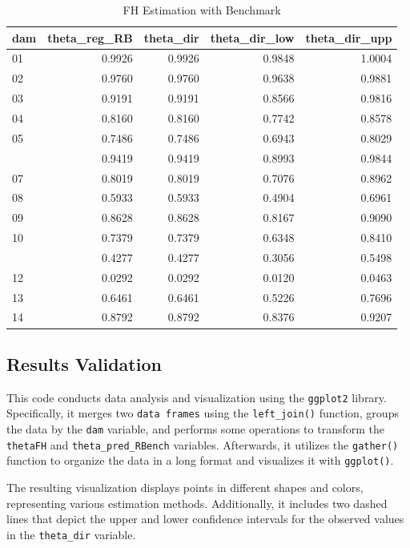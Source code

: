 \documentclass[
  12pt,
]{book}
\begin{document}
\begin{table}[H]

\caption{\label{tab:unnamed-chunk-24}FH Estimation with Benchmark}
\centering
\begin{tabular}[t]{lrrrr}
\toprule
dam & theta\_reg\_RB & theta\_dir & theta\_dir\_low & theta\_dir\_upp\\
\midrule
01 & 0.9926 & 0.9926 & 0.9848 & 1.0004\\
02 & 0.9760 & 0.9760 & 0.9638 & 0.9881\\
03 & 0.9191 & 0.9191 & 0.8566 & 0.9816\\
04 & 0.8160 & 0.8160 & 0.7742 & 0.8578\\
05 & 0.7486 & 0.7486 & 0.6943 & 0.8029\\
\addlinespace
06 & 0.9419 & 0.9419 & 0.8993 & 0.9844\\
07 & 0.8019 & 0.8019 & 0.7076 & 0.8962\\
08 & 0.5933 & 0.5933 & 0.4904 & 0.6961\\
09 & 0.8628 & 0.8628 & 0.8167 & 0.9090\\
10 & 0.7379 & 0.7379 & 0.6348 & 0.8410\\
\addlinespace
11 & 0.4277 & 0.4277 & 0.3056 & 0.5498\\
12 & 0.0292 & 0.0292 & 0.0120 & 0.0463\\
13 & 0.6461 & 0.6461 & 0.5226 & 0.7696\\
14 & 0.8792 & 0.8792 & 0.8376 & 0.9207\\
\bottomrule
\end{tabular}
\end{table}

\hypertarget{results-validation}{%
\subsection{Results Validation}\label{results-validation}}

This code conducts data analysis and visualization using the \texttt{ggplot2} library. Specifically, it merges two \texttt{data\ frames} using the \texttt{left\_join()} function, groups the data by the \texttt{dam} variable, and performs some operations to transform the \texttt{thetaFH} and \texttt{theta\_pred\_RBench} variables. Afterwards, it utilizes the \texttt{gather()} function to organize the data in a long format and visualizes it with \texttt{ggplot()}.

The resulting visualization displays points in different shapes and colors, representing various estimation methods. Additionally, it includes two dashed lines that depict the upper and lower confidence intervals for the observed values in the \texttt{theta\_dir} variable.
\end{document}
